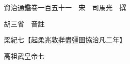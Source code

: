 










 


 
 


 

  
  
  
  
  





  
  
  
  
  
 
  

  

  
  
  



  

 
 

  
   




  

  
  


  　　資治通鑑卷一百五十一　宋　司馬光　撰

　　胡三省　音註

　　梁紀七【起柔兆敦牂盡彊圉協洽凡二年】

　　高祖武皇帝七

